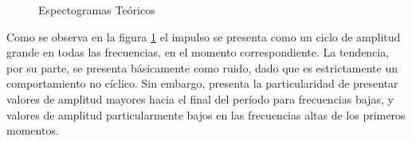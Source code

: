 \documentclass[a4paper]{article}
\begin{document}
\begin{figure}[H]
	    \vspace{0.00mm}
	    \vspace{0.00mm}
	    \vspace{0.00mm}
	\caption{Espectogramas Teóricos} \label{fig:espect_teo}
\end{figure}

Como se observa en la figura \ref{fig:espect_teo} el impulso se presenta como un ciclo de amplitud grande en todas las frecuencias, en el momento correspondiente. La tendencia, por su parte, se presenta básicamente como ruido, dado que es estrictamente un comportamiento no cíclico. Sin embargo, presenta la particularidad de presentar valores de amplitud mayores hacia el final del período para frecuencias bajas, y valores de amplitud particularmente bajos en las frecuencias altas de los primeros momentos.
\end{document}
